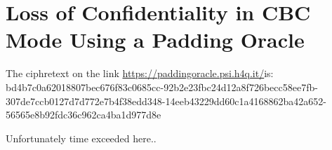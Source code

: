 \section{Loss of Confidentiality in CBC Mode Using a Padding Oracle}

The ciphretext on the link \url{https://paddingoracle.psi.h4q.it/}is:\\
bd4b7c0a62018807bec676f83c0685cc-92b2e23fbc24d12a8f726becc58ee7fb-307de7ccb0127d7d772e7b4f38edd348-14eeb43229dd60c1a4168862ba42a652-56565e8b92fdc36c962ca4ba1d977d8e


Unfortunately time exceeded here..